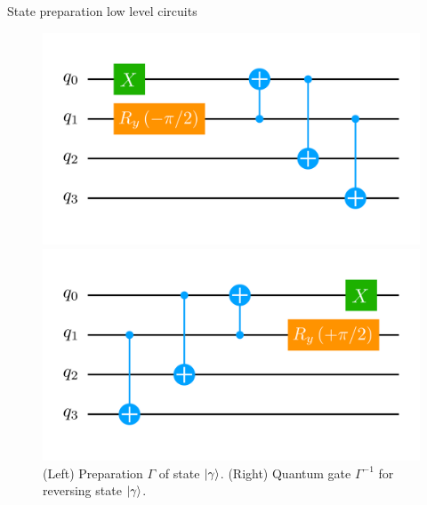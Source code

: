 \documentclass[9pt, aspectratio=169]{beamer}
\begin{document}
\begin{frame}[allowframebreaks]{State preparation low level circuits}

	\begin{figure}[!p]
		\centering
		\begin{minipage}[c]{.45\linewidth}
			\centering
			\includegraphics[width=\linewidth]{Figures/NJL1-model-solving/ansatz-implementation-base-state-preparation-gamma}
		\end{minipage}
	  \hspace{.025\linewidth}
		\begin{minipage}[c]{.45\linewidth}
			\centering
			\includegraphics[width=\linewidth]{Figures/NJL1-model-solving/ansatz-implementation-base-state-reversing-gamma}
		\end{minipage}
		\caption{(Left) Preparation $\Gamma$ of state $\ket{\gamma}$. (Right) Quantum gate $\Gamma^{-1}$ for reversing state $\ket{\gamma}$.}
	\end{figure}

\break


\end{frame}
\end{document}
